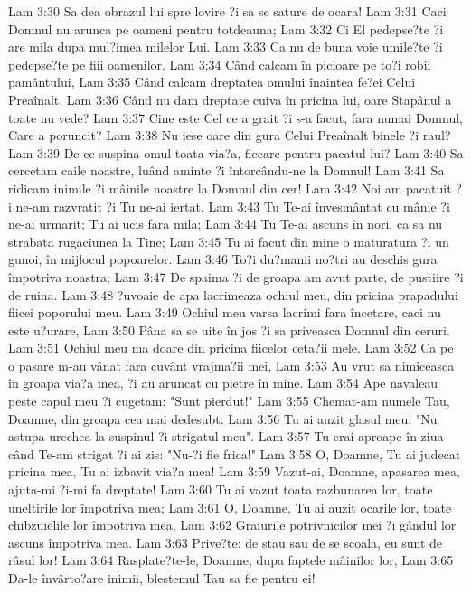 Lam 3:30  Sa dea obrazul lui spre lovire ?i sa se sature de ocara!
Lam 3:31  Caci Domnul nu arunca pe oameni pentru totdeauna;
Lam 3:32  Ci El pedepse?te ?i are mila dupa mul?imea milelor Lui.
Lam 3:33  Ca nu de buna voie umile?te ?i pedepse?te pe fiii oamenilor.
Lam 3:34  Când calcam în picioare pe to?i robii pamântului,
Lam 3:35  Când calcam dreptatea omului înaintea fe?ei Celui Preaînalt,
Lam 3:36  Când nu dam dreptate cuiva în pricina lui, oare Stapânul a toate nu vede?
Lam 3:37  Cine este Cel ce a grait ?i s-a facut, fara numai Domnul, Care a poruncit?
Lam 3:38  Nu iese oare din gura Celui Preaînalt binele ?i raul?
Lam 3:39  De ce suspina omul toata via?a, fiecare pentru pacatul lui?
Lam 3:40  Sa cercetam caile noastre, luând aminte ?i întorcându-ne la Domnul!
Lam 3:41  Sa ridicam inimile ?i mâinile noastre la Domnul din cer!
Lam 3:42  Noi am pacatuit ?i ne-am razvratit ?i Tu ne-ai iertat.
Lam 3:43  Tu Te-ai învesmântat cu mânie ?i ne-ai urmarit; Tu ai ucis fara mila;
Lam 3:44  Tu Te-ai ascuns în nori, ca sa nu strabata rugaciunea la Tine;
Lam 3:45  Tu ai facut din mine o maturatura ?i un gunoi, în mijlocul popoarelor.
Lam 3:46  To?i du?manii no?tri au deschis gura împotriva noastra;
Lam 3:47  De spaima ?i de groapa am avut parte, de pustiire ?i de ruina.
Lam 3:48  ?uvoaie de apa lacrimeaza ochiul meu, din pricina prapadului fiicei poporului meu.
Lam 3:49  Ochiul meu varsa lacrimi fara încetare, caci nu este u?urare,
Lam 3:50  Pâna sa se uite în jos ?i sa priveasca Domnul din ceruri.
Lam 3:51  Ochiul meu ma doare din pricina fiicelor ceta?ii mele.
Lam 3:52  Ca pe o pasare m-au vânat fara cuvânt vrajma?ii mei,
Lam 3:53  Au vrut sa nimiceasca în groapa via?a mea, ?i au aruncat cu pietre în mine.
Lam 3:54  Ape navaleau peste capul meu ?i cugetam: "Sunt pierdut!"
Lam 3:55  Chemat-am numele Tau, Doamne, din groapa cea mai dedesubt.
Lam 3:56  Tu ai auzit glasul meu: "Nu astupa urechea la suspinul ?i strigatul meu".
Lam 3:57  Tu erai aproape în ziua când Te-am strigat ?i ai zis: "Nu-?i fie frica!"
Lam 3:58  O, Doamne, Tu ai judecat pricina mea, Tu ai izbavit via?a mea!
Lam 3:59  Vazut-ai, Doamne, apasarea mea, ajuta-mi ?i-mi fa dreptate!
Lam 3:60  Tu ai vazut toata razbunarea lor, toate uneltirile lor împotriva mea;
Lam 3:61  O, Doamne, Tu ai auzit ocarile lor, toate chibzuielile lor împotriva mea,
Lam 3:62  Graiurile potrivnicilor mei ?i gândul lor ascuns împotriva mea.
Lam 3:63  Prive?te: de stau sau de se scoala, eu sunt de râsul lor!
Lam 3:64  Rasplate?te-le, Doamne, dupa faptele mâinilor lor,
Lam 3:65  Da-le învârto?are inimii, blestemul Tau sa fie pentru ei!
